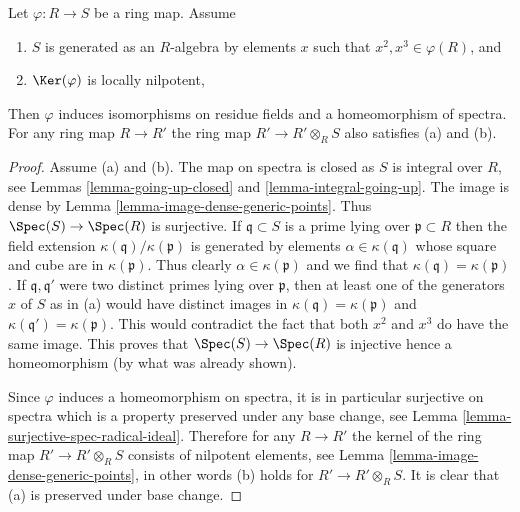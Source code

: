 \begin{lemma}
\label{lemma-2-3-ring-map}
Let $\varphi : R \to S$ be a ring map. Assume
\begin{enumerate}
\item[(a)] $S$ is generated as an $R$-algebra by elements $x$ such
that $x^2, x^3 \in \varphi(R)$, and
\item[(b)] $\Ker(\varphi)$ is locally nilpotent,
\end{enumerate}
Then $\varphi$ induces isomorphisms on residue fields and
a homeomorphism of spectra. For any ring map $R \to R'$
the ring map $R' \to R' \otimes_R S$ also satisfies (a) and (b).
\end{lemma}

\begin{proof}
Assume (a) and (b). The map on spectra is closed as $S$ is integral
over $R$, see Lemmas \ref{lemma-going-up-closed} and
\ref{lemma-integral-going-up}. The image is dense by
Lemma \ref{lemma-image-dense-generic-points}. Thus $\Spec(S) \to \Spec(R)$
is surjective. If $\mathfrak q \subset S$ is a prime lying over
$\mathfrak p \subset R$ then the field extension
$\kappa(\mathfrak q)/\kappa(\mathfrak p)$ is generated by elements
$\alpha \in \kappa(\mathfrak q)$ whose square and cube are
in $\kappa(\mathfrak p)$. Thus clearly $\alpha \in \kappa(\mathfrak p)$
and we find that $\kappa(\mathfrak q) = \kappa(\mathfrak p)$.
If $\mathfrak q, \mathfrak q'$ were two distinct primes lying over
$\mathfrak p$, then at least one of the generators $x$ of $S$ as
in (a) would have distinct images in
$\kappa(\mathfrak q) = \kappa(\mathfrak p)$ and
$\kappa(\mathfrak q') = \kappa(\mathfrak p)$.
This would contradict the fact that both $x^2$ and $x^3$
do have the same image. This proves that $\Spec(S) \to \Spec(R)$
is injective hence a homeomorphism (by what was already shown).

\medskip\noindent
Since $\varphi$ induces a homeomorphism on spectra, it is in particular
surjective on spectra which is a property preserved under any base change, see
Lemma \ref{lemma-surjective-spec-radical-ideal}.
Therefore for any $R \to R'$ the kernel of the ring map
$R' \to R' \otimes_R S$ consists of nilpotent elements, see
Lemma \ref{lemma-image-dense-generic-points},
in other words (b) holds for $R' \to R' \otimes_R S$.
It is clear that (a) is preserved under base change.
\end{proof}